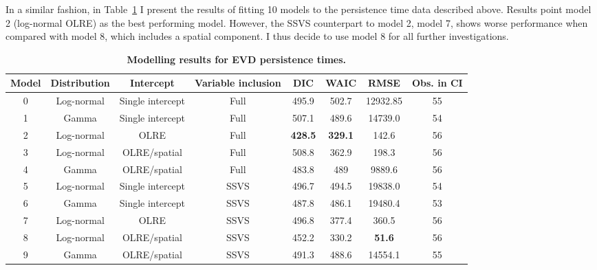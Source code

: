 In a similar fashion, in Table~\ref{tab:persistenceModels} I present the results of fitting 10 models to the persistence time data described above.
Results point model 2 (log-normal OLRE) as the best performing model.
However, the SSVS counterpart to model 2, model 7, shows worse performance when compared with model 8, which includes a spatial component.
I thus decide to use model 8 for all further investigations.

\begin{minipage}{\textwidth}    
\setcounter{mpfootnote}{\value{footnote}}
\renewcommand{\thempfootnote}{\arabic{mpfootnote}}
\fontsize{9}{10}\selectfont
{}
\begin{longtable}{cccccccc}
\caption[Modelling results for EVD persistence times.]{\textbf{Modelling results for EVD persistence times.}}
\label{tab:persistenceModels}\\
\toprule
Model & Distribution & Intercept& Variable inclusion & DIC  & WAIC   & RMSE\footnotemark[1] & Obs. in CI\footnotemark[2]\\
\toprule
0  & Log-normal & Single intercept & Full & 495.9 & 502.7 & 12932.85 & 55 \\
\hline
1   & Gamma & Single intercept & Full &  507.1 & 489.6 & 14739.0 & 54 \\
\hline
2 & Log-normal & OLRE & Full &  \textbf{428.5} & \textbf{329.1} & 142.6   & 56 \\
\hline
3 & Log-normal & OLRE/spatial\footnotemark[3] & Full & 508.8 & 362.9 & 198.3   & 56 \\
\hline
4 & Gamma & OLRE/spatial\footnotemark[4] & Full & 483.8 & 489 & 9889.6  & 56 \\
\hline
5 & Log-normal  & Single intercept & SSVS & 496.7 & 494.5 & 19838.0 & 54 \\
\hline
6 & Gamma & Single intercept & SSVS & 487.8 & 486.1 & 19480.4 & 53 \\
\hline
7 & Log-normal & OLRE & SSVS &  496.8 & 377.4 & 360.5 & 56 \\
\hline
8 & Log-normal & OLRE/spatial\footnotemark[3] & SSVS & 452.2 & 330.2 & \textbf{51.6}  & 56 \\
\hline
9 & Gamma & OLRE/spatial\footnotemark[4]& SSVS &  491.3 & 488.6 & 14554.1 & 55 \\
\bottomrule
\end{longtable}
\setcounter{footnote}{\value{mpfootnote}}
\end{minipage}

